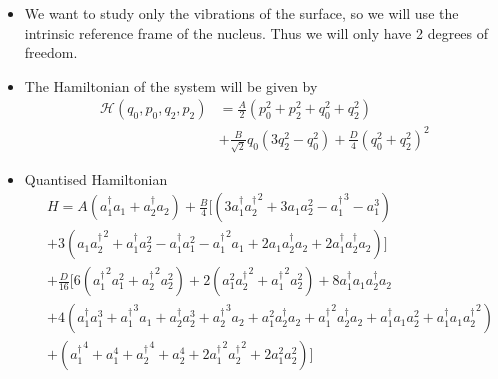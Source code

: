 \documentclass[a4,compress]{beamer}
\newcommand{\ad}[1]{a_{#1}^{\dagger}}       %
\begin{document}
\begin{frame}
  \begin{itemize}
    \item We want to study only the vibrations of the surface, so we will
    use the intrinsic reference frame of the nucleus. Thus we will only have
    2 degrees of freedom.
    \item The Hamiltonian of the system will be given by
    \[
    \begin{split}
      \mathcal{H}(q_0,p_0,q_2,p_2) &= \frac{A}{2}(p_0^2 + p_2^2 + q_0^2 + q_2^2) \\
      &+ \frac{B}{\sqrt{2}}q_0(3q_2^2 - q_0^2)
      + \frac{D}{4}{(q_0^2 + q_2^2)}^2
    \end{split}
    \]
  \end{itemize}
\end{frame}


\begin{frame}
  \begin{itemize}
    \item Quantised Hamiltonian
    \footnotesize
    \[
    \begin{split}
      &H = A \left( \ad{1} a_1 + \ad{2} a_2 \right)
        + \frac{B}{4} \bigg[ \left( 3 \ad{1} {\ad{2}}^2 + 3 a_1 a_2^2
                                   - {\ad{1}}^3 - a_1^3 \right)   \\
      & + 3 \left( a_1 {\ad{2}}^2 + \ad{1} a_2^2 - \ad{1} a_1^2 - {\ad{1}}^2 a_1
                 + 2 a_1 \ad{2} a_2 + 2 \ad{1} \ad{2} a_2
              \right) \bigg]  \\
      & + \frac{D}{16} \bigg[ 6 \left( {\ad{1}}^2 a_1^2 + {\ad{2}}^2 a_2^2 \right)
                            + 2 \left( a_1^2 {\ad{2}}^2 + {\ad{1}}^2 a_2^2 \right)
                            + 8 \ad{1} a_1 \ad{2} a_2  \\
      & + 4 \left(\ad{1} a_1^3 + {\ad{1}}^3 a_1 + \ad{2} a_2^3 + {\ad{2}}^3 a_2
         + a_1^2 \ad{2} a_2 + {\ad{1}}^2 \ad{2} a_2 + \ad{1} a_1 a_2^2 + \ad{1} a_1 {\ad{2}}^2
            \right)  \\
      & + \left( {\ad{1}}^4 + a_1^4 + {\ad{2}}^4 + a_2^4
         + 2 {\ad{1}}^2 {\ad{2}}^2 + 2 a_1^2 a_2^2
          \right)
                            \bigg]
    \end{split}
    \]
  \end{itemize}
\end{frame}
\end{document}
